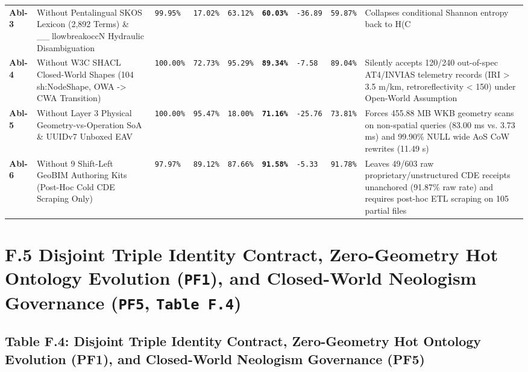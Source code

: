 \documentclass[10pt,a4paper]{article}
\begin{document}
{\begin{longtable}{p{}p{}p{}p{}p{}p{}p{}p{}p{}}
\textbf{Abl-3} & Without Pentalingual SKOS Lexicon (2,892 Terms) \& \_\_llowbreak{}occN Hydraulic Disambiguation & \texttt{99.95\%} & \texttt{17.02\%} & \texttt{63.12\%} & \textbf{\texttt{60.03\%}} & \texttt{-36.89} & \texttt{59.87\%} & Collapses conditional Shannon entropy back to H(C \\
\textbf{Abl-4} & Without W3C SHACL Closed-World Shapes (104 sh:NodeShape, OWA -> CWA Transition) & \texttt{100.00\%} & \texttt{72.73\%} & \texttt{95.29\%} & \textbf{\texttt{89.34\%}} & \texttt{-7.58} & \texttt{89.04\%} & Silently accepts 120/240 out-of-spec AT4/INVIAS telemetry records (IRI > 3.5 m/km, retroreflectivity < 150) under Open-World Assumption \\
\textbf{Abl-5} & Without Layer 3 Physical Geometry-vs-Operation SoA \& UUIDv7 Unboxed EAV & \texttt{100.00\%} & \texttt{95.47\%} & \texttt{18.00\%} & \textbf{\texttt{71.16\%}} & \texttt{-25.76} & \texttt{73.81\%} & Forces 455.88 MB WKB geometry scans on non-spatial queries (83.00 ms vs. 3.73 ms) and 99.90\% NULL wide AoS CoW rewrites (11.49 s) \\
\textbf{Abl-6} & Without 9 Shift-Left GeoBIM Authoring Kits (Post-Hoc Cold CDE Scraping Only) & \texttt{97.97\%} & \texttt{89.12\%} & \texttt{87.66\%} & \textbf{\texttt{91.58\%}} & \texttt{-5.33} & \texttt{91.78\%} & Leaves 49/603 raw proprietary/unstructured CDE receipts unanchored (91.87\% raw rate) and requires post-hoc ETL scraping on 105 partial files \\
\bottomrule
\end{longtable}
}



\section*{F.5 Disjoint Triple Identity Contract, Zero-Geometry Hot Ontology Evolution (\texttt{PF1}), and Closed-World Neologism Governance (\texttt{PF5}, \texttt{Table F.4})}

\subsection*{Table F.4: Disjoint Triple Identity Contract, Zero-Geometry Hot Ontology Evolution (PF1), and Closed-World Neologism Governance (PF5)}
\end{document}
